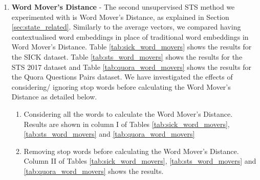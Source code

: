 \begin{enumerate}
	
	\item \textbf{Word Mover's Distance} - The second unsupervised STS method we experimented with is Word Mover's Distance, as explained in Section \ref{sec:state_related}. Similarly to the average vectors, we compared having contextualised word embeddings in place of traditional word embeddings in Word Mover's Distance. Table \ref{tab:sick_word_movers} shows the results for the SICK dataset. Table \ref{tab:sts_word_movers} shows the results for the STS 2017 dataset and Table \ref{tab:quora_word_movers} shows the results for the Quora Questions Pairs dataset. We have investigated the effects of considering/ ignoring stop words before calculating the Word Mover's Distance as detailed below. 
	
	\begin{enumerate}
		\item Considering all the words to calculate the Word Mover's Distance. Results are shown in column I of Tables \ref{tab:sick_word_movers}, \ref{tab:sts_word_movers} and \ref{tab:quora_word_movers}
		\item Removing stop words before calculating the Word Mover's Distance. Column II of Tables \ref{tab:sick_word_movers}, \ref{tab:sts_word_movers} and \ref{tab:quora_word_movers} shows the results. 
	\end{enumerate} 
	
	

\begin{table}[htb]
	\centering
\end{table}
\end{enumerate}
